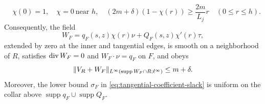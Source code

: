 \begin{collarlemma}
\begin{equation}
 \quad \chi(0)=1,
 \quad \chi=0\ \text{near }h,
 \quad
 (2m+\delta)(1-\chi(r))\ge \frac{2m}{L_j}r
 \quad(0\le r\le h).
\end{equation}
Consequently, the field
\begin{equation}
\label{eq:local-solenoidal-collar}
 W_F=q_F(s,z)\chi(r)\nu+Q_F(s,z)\chi'(r)\tau,
\end{equation}
extended by zero at the inner and tangential edges, is smooth on a
neighborhood of $R$, satisfies $\operatorname{div} W_F=0$ and $W_F\cdot\nu=q_F$ on $F$,
and obeys
\begin{equation}
\label{eq:local-collar-capacity}
 \lVert V_R+W_F \rVert_{L^\infty(\operatorname{supp}W_F\cap R;\ell^\infty)}
 \le m+\delta.
\end{equation}
Moreover, the lower bound $\sigma_F$ in
\eqref{eq:tangential-coefficient-slack} is uniform on the collar above
$\operatorname{supp}q_F\cup\operatorname{supp}Q_F$.
\end{collarlemma}

